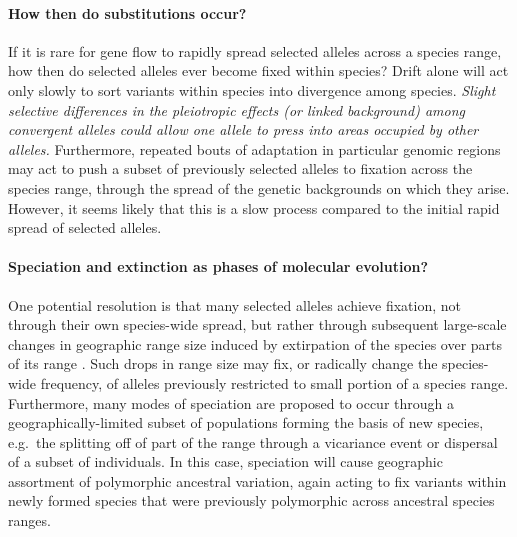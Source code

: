 \documentclass{article}
\newcommand{\gc}[1]{{\it\color{blue} #1} }
\begin{document}
\paragraph{How then do substitutions occur?}
If it is rare for gene flow to rapidly spread selected alleles across a species range, 
how then do selected alleles ever become fixed within species? 
Drift alone will act only slowly to sort variants within species into
divergence among species. 
\gc{Slight selective differences in the pleiotropic effects (or linked
  background) among convergent alleles could allow one allele to
  press into areas occupied by other alleles.}
Furthermore, repeated bouts of adaptation in particular genomic regions may act 
to push a subset of previously selected alleles to fixation across the
species range, through the spread of the genetic backgrounds on which
they arise.  
However, it seems likely that this is a slow process compared to the
initial rapid spread of selected alleles.
\
\paragraph{Speciation and extinction as phases of molecular evolution?}
One potential resolution is that many selected alleles achieve
fixation, not through their own species-wide spread, but rather
through subsequent large-scale changes in geographic range size
induced by extirpation of the species over parts of its range
\citep[see ][and references therein for how such a model could be constructed]{barton2013modelling}. 
Such drops in range size may fix, or radically change the species-wide frequency, 
of alleles previously restricted to small portion of a species range. 
Furthermore, many modes of speciation are proposed to occur through a
geographically-limited subset of populations forming the basis of new species, 
e.g.\ the splitting off of part of the range through a vicariance event 
or dispersal of a subset of individuals. 
In this case, speciation will cause geographic assortment of
polymorphic ancestral variation, again acting to fix variants within
newly formed species that were previously polymorphic across ancestral species ranges. 
\end{document}
